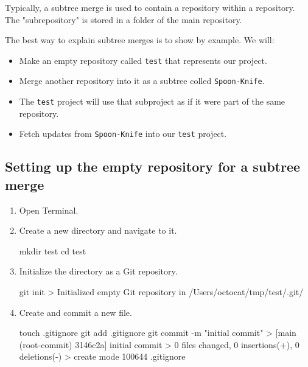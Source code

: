 Typically, a subtree merge is used to contain a repository within a repository. The "subrepository" is stored in a folder of the main repository. 

 The best way to explain subtree merges is to show by example. We will:
 \begin{itemize}
    \item Make an empty repository called \texttt{test} that represents our project.
    \item Merge another repository into it as a subtree colled \texttt{Spoon-Knife}.
    \item The \texttt{test} project will use that subproject as if it were part of the same repository.
    \item Fetch updates from \texttt{Spoon-Knife} into our \texttt{test} project.
 \end{itemize}

 \subsection{Setting up the empty repository for a subtree merge}
 \begin{enumerate}
    \item Open Terminal.
    \item Create a new directory and navigate to it.
    \begin{codeblock}[language=bash]
mkdir test 
cd test 
    \end{codeblock}
    \item Initialize the directory as a Git repository.
    \begin{codeblock}[language=bash]
git init
> Initialized empty Git repository in /Users/octocat/tmp/test/.git/
    \end{codeblock}
    \item Create and commit a new file.
    \begin{codeblock}[language=bash]
touch .gitignore
git add .gitignore
git commit -m "initial commit"
> [main (root-commit) 3146c2a] initial commit
>  0 files changed, 0 insertions(+), 0 deletions(-)
>  create mode 100644 .gitignore
    \end{codeblock}
 \end{enumerate}

